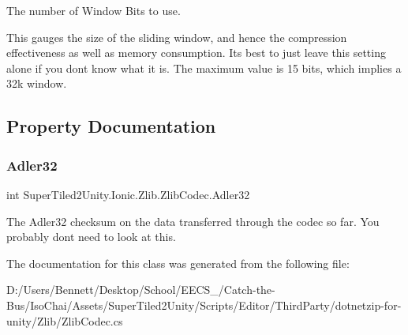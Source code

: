 The number of Window Bits to use. ~\newline


This gauges the size of the sliding window, and hence the compression effectiveness as well as memory consumption. It\textquotesingle{}s best to just leave this setting alone if you don\textquotesingle{}t know what it is. The maximum value is 15 bits, which implies a 32k window. ~\newline


\subsection{Property Documentation}
\mbox{\label{class_super_tiled2_unity_1_1_ionic_1_1_zlib_1_1_zlib_codec_a8874d5a22e1d940e2fa5572193e378f7}} 
\subsubsection{\texorpdfstring{Adler32}{Adler32}}
{\footnotesize\ttfamily int Super\+Tiled2\+Unity.\+Ionic.\+Zlib.\+Zlib\+Codec.\+Adler32\hspace{0.3cm}{\ttfamily [get]}}



The Adler32 checksum on the data transferred through the codec so far. You probably don\textquotesingle{}t need to look at this. 



The documentation for this class was generated from the following file\+:\begin{DoxyCompactItemize}
\item 
D\+:/\+Users/\+Bennett/\+Desktop/\+School/\+E\+E\+C\+S\+\_/\+Catch-\/the-\/\+Bus/\+Iso\+Chai/\+Assets/\+Super\+Tiled2\+Unity/\+Scripts/\+Editor/\+Third\+Party/dotnetzip-\/for-\/unity/\+Zlib/Zlib\+Codec.\+cs\end{DoxyCompactItemize}
